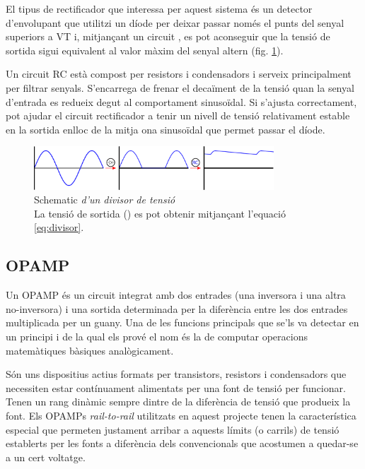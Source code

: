 El tipus de rectificador que interessa per aquest sistema és un detector d'envolupant que utilitzi un díode per deixar passar només el punts del senyal superiors a \ac{VT} i, mitjançant un circuit , es pot aconseguir que la tensió de sortida sigui equivalent al valor màxim del senyal altern (fig. \ref{fig:grafica_senyal}).

Un circuit \ac{RC} està compost per resistors i condensadors i serveix principalment per filtrar senyals. S'encarrega de frenar el decaïment de la tensió quan la senyal d'entrada es redueix degut al comportament sinusoïdal. Si s'ajusta correctament, pot ajudar el circuit rectificador a tenir un nivell de tensió relativament estable en la sortida enlloc de la mitja ona sinusoïdal que permet passar el díode.

\begin{figure}[htp]
	\centering
	\includegraphics[width=0.8\textwidth]{Figures/wave_graph.pdf}
	\caption[Gràfica de l'efecte del detector d'envolupant]{Schematic\textit{ d'un divisor de tensió}\\{\footnotesize La tensió de sortida () es pot obtenir mitjançant l'equació \ref{eq:divisor}.}}
	\label{fig:grafica_senyal}
\end{figure}

\subsection{\acl{OPAMP}}\label{subsec:amplificador_operacioanl}

Un \ac{OPAMP} és un circuit integrat amb dos entrades (una inversora i una altra no-inversora) i una sortida determinada per la diferència entre les dos entrades multiplicada per un guany. Una de les funcions principals que se'ls va detectar en un principi i de la qual els prové el nom és la de computar operacions matemàtiques bàsiques analògicament. 


Són uns dispositius actius formats per transistors, resistors i condensadors que necessiten estar contínuament alimentats per una font de tensió per funcionar. Tenen un rang dinàmic sempre dintre de la diferència de tensió que produeix la font. Els \acp{OPAMP} \textit{rail-to-rail} utilitzats en aquest projecte tenen la característica especial que permeten justament arribar a aquests límits (o carrils) de tensió establerts per les fonts a diferència dels convencionals que acostumen a quedar-se a un cert voltatge.

